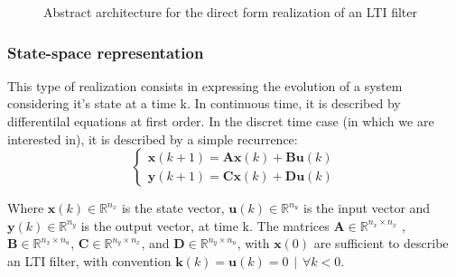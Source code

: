 \begin{figure*}

\caption{Abstract architecture for the direct form realization of an LTI filter \label{fig:ltiarch}}
\end{figure*}

	\subsubsection{State-space representation}
	This type of realization consists in expressing the evolution of a system considering it’s state at a time k. In
	continuous time, it is described by differentilal equations at first order. In the discret time case (in which we
	are interested in), it is described by a simple recurrence:
	\begin{equation} \label{abcddef}
		\begin{cases}
			\boldsymbol{x}(k+1)= \boldsymbol{Ax}(k) + \boldsymbol{Bu}(k) \\
			\boldsymbol{y}(k+1)= \boldsymbol{Cx}(k) + \boldsymbol{Du}(k)
		\end{cases}
	\end{equation}

	Where $\boldsymbol{x}(k) \in \mathbb{R}^{n_x}$ is the state vector,
	$\boldsymbol{u}(k) \in \mathbb{R}^{n_u}$ is the input vector and
	$\boldsymbol{y}(k) \in \mathbb{R}^{n_y}$ is the output vector, at time k.
	The matrices $\boldsymbol{A} \in \mathbb{R}^{n_x \times n_x}$ , $\boldsymbol{B} \in \mathbb{R}^{n_x \times n_u}$,
	$\boldsymbol{C} \in \mathbb{R}^{n_y \times n_x}$, and $\boldsymbol{D} \in \mathbb{R}^{n_y \times n_u}$,
	with $\boldsymbol{x}(0)$ are sufficient to describe an LTI filter, with convention $\boldsymbol{k}(k)=\boldsymbol{u}(k)=0 \hspace{5pt} | \hspace{5pt} \forall k<0$.

